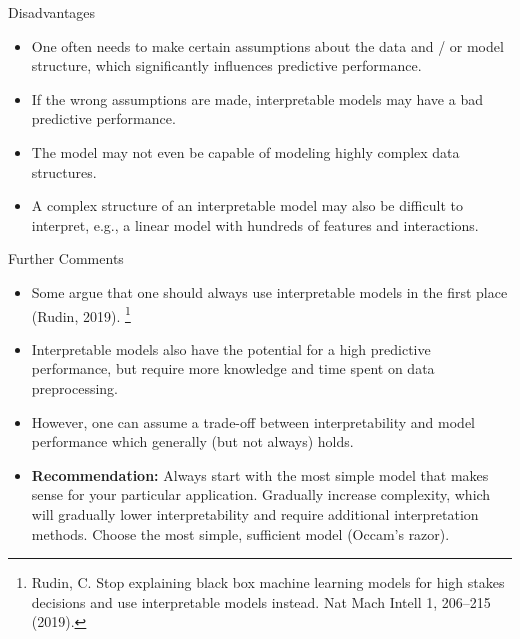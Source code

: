 \documentclass[11pt,compress,t,notes=noshow, aspectratio=169, xcolor=table]{beamer}
\begin{document}
\begin{vbframe}{Disadvantages}

    \begin{itemize}
    \itemsep2em
        \item One often needs to make certain assumptions about the data and / or model structure, which significantly influences predictive performance.
        \item If the wrong assumptions are made, interpretable models may have a bad predictive performance.
        \item The model may not even be capable of modeling highly complex data structures.
        \item A complex structure of an interpretable model may also be difficult to interpret, e.g., a linear model with hundreds of features and interactions.
    \end{itemize}	
	
\end{vbframe}

\begin{vbframe}{Further Comments}

    \begin{itemize}
    \itemsep1em
        \item Some argue that one should always use interpretable models in the first place (Rudin, 2019).
        \footnote[frame]{Rudin, C. Stop explaining black box machine learning models for high stakes decisions and use interpretable models instead. Nat Mach Intell 1, 206–215 (2019).}
        \item Interpretable models also have the potential for a high predictive performance, but require more knowledge and time spent on data preprocessing.
        \item However, one can assume a trade-off between interpretability and model performance which generally (but not always) holds.
        \item \textbf{Recommendation:} Always start with the most simple model that makes sense for your particular application. Gradually increase complexity, which will gradually lower interpretability and require additional interpretation methods. Choose the most simple, sufficient model (Occam's razor).
    \end{itemize}	
	
\end{vbframe}
\end{document}
